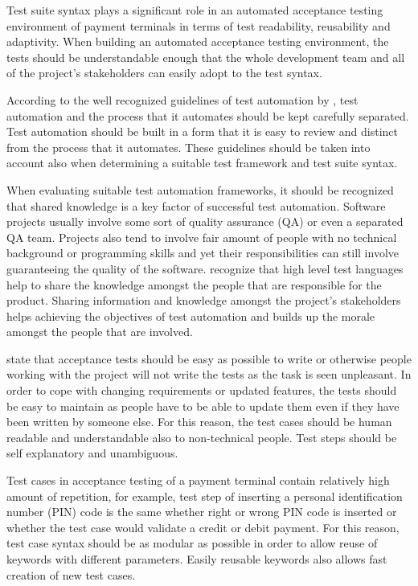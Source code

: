 Test suite syntax plays a significant role in an automated acceptance testing environment of payment terminals in terms of test readability, reusability and adaptivity. When building an automated acceptance testing environment, the tests should be understandable enough that the whole development team and all of the project's stakeholders can easily adopt to the test syntax.

According to the well recognized guidelines of test automation by \cite{snakeoil}, test automation and the process that it automates should be kept carefully separated. Test automation should be built in a form that it is easy to review and distinct from the process that it automates. These guidelines should be taken into account also when determining a suitable test framework and test suite syntax.

When evaluating suitable test automation frameworks, it should be recognized that shared knowledge is a key factor of successful test automation. Software projects usually involve some sort of quality assurance (QA) or even a separated QA team. Projects also tend to involve fair amount of people with no technical background or programming skills and yet their responsibilities can still involve guaranteeing the quality of the software. \cite{just_enough} recognize that high level test languages help to share the knowledge amongst the people that are responsible for the product. Sharing information and knowledge amongst the project's stakeholders helps achieving the objectives of test automation and builds up the morale amongst the people that are involved.

\cite{lowell2003successful} state that acceptance tests should be easy as possible to write or otherwise people working with the project will not write the tests as the task is seen unpleasant. In order to cope with changing requirements or updated features, the tests should be easy to maintain as people have to be able to update them even if they have been written by someone else. For this reason, the test cases should be human readable and understandable also to non-technical people. Test steps should be self explanatory and unambiguous.

Test cases in acceptance testing of a payment terminal contain relatively high amount of repetition, for example, test step of inserting a personal identification number (PIN) code is the same whether right or wrong PIN code is inserted or whether the test case would validate a credit or debit payment. For this reason, test case syntax should be as modular as possible in order to allow reuse of keywords with different parameters. Easily reusable keywords also allows fast creation of new test cases.

